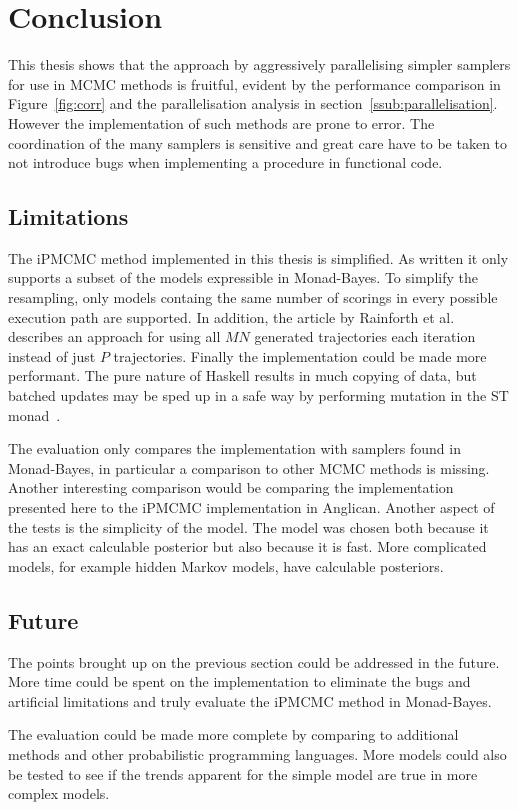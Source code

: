 \section{Conclusion}

This thesis shows that the approach by aggressively parallelising simpler samplers for use in MCMC methods is fruitful, evident by the performance comparison in Figure~\ref{fig:corr} and the parallelisation analysis in section~\ref{ssub:parallelisation}. However the implementation of such methods are prone to error. The coordination of the many samplers is sensitive and great care have to be taken to not introduce bugs when implementing a procedure in functional code.

\subsection{Limitations}
\label{sec:limits}

The iPMCMC method implemented in this thesis is simplified. As written it only supports a subset of the models expressible in Monad-Bayes. To simplify the resampling, only models containg the same number of scorings in every possible execution path are supported. In addition, the article by Rainforth et al. describes an approach for using all $MN$ generated trajectories each iteration instead of just $P$ trajectories. Finally the implementation could be made more performant. The pure nature of Haskell results in much copying of data, but batched updates may be sped up in a safe way by performing mutation in the ST monad~\cite{stmonad}.

The evaluation only compares the implementation with samplers found in Monad-Bayes, in particular a comparison to other MCMC methods is missing. Another interesting comparison would be comparing the implementation presented here to the iPMCMC implementation in Anglican. Another aspect of the tests is the simplicity of the model. The model was chosen both because it has an exact calculable posterior but also because it is fast. More complicated models, for example hidden Markov models, have calculable posteriors.

\subsection{Future}

The points brought up on the previous section could be addressed in the future. More time could be spent on the implementation to eliminate the bugs and artificial limitations and truly evaluate the iPMCMC method in Monad-Bayes. 

The evaluation could be made more complete by comparing to additional methods and other probabilistic programming languages. More models could also be tested to see if the trends apparent for the simple model are true in more complex models.

